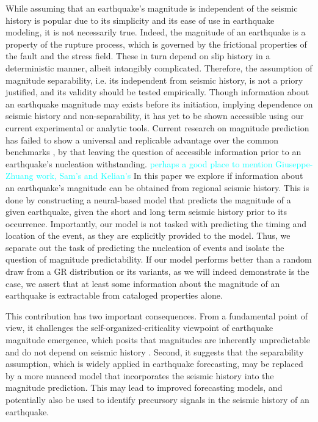 \documentclass[pdflatex]{sn-jnl}
\newcommand{\neri}[1]{{\textcolor{cyan}{#1}}}
\begin{document}
While assuming that an earthquake's magnitude is independent of the seismic history is popular due to its simplicity and its ease of use in earthquake modeling, it is not necessarily true. Indeed, the magnitude of an earthquake is a property of the rupture process, which is governed by the frictional properties of the fault and the stress field. These in turn depend on slip history in a deterministic manner, albeit intangibly complicated. Therefore, the assumption of magnitude separability, i.e. its independent from seismic history, is not a priory justified, and its validity should be tested empirically.
Though information about an earthquake magnitude may exists before its initiation, implying dependence on seismic history and non-separability, it has yet to be shown accessible using our current experimental or analytic tools. Current research on magnitude prediction has failed to show a universal and replicable advantage over the common benchmarks \cite{shcherbakov_forecasting_2019, ogata_exploring_2018, stockman_forecasting_2023,  panakkat_neural_2007}, by that leaving the question of accessible information prior to an earthquake's nucleation withstanding. 
\newline
\neri{perhaps a good place to mention Giuseppe-Zhuang work, Sam's  and Kelian's}
In this paper we explore if information about an earthquake's magnitude can be obtained from regional seismic history. This is done by constructing a neural-based model that predicts the magnitude of a given earthquake, given the short and long term seismic history prior to its occurrence. Importantly, our model is not tasked with predicting the timing and location of the event, as they are explicitly provided to the model. Thus, we separate out the task of predicting the nucleation of events and isolate the question of magnitude predictability. If our model performs better than a random draw from a GR distribution or its variants, as we will indeed demonstrate is the case, we assert that at least some information about the magnitude of an earthquake is extractable from cataloged properties alone. 


This contribution has two important consequences. From a fundamental point of view, it challenges the self-organized-criticality viewpoint of earthquake magnitude emergence, which posits that magnitudes are inherently unpredictable and do not depend on seismic history \cite{olami_self-organized_1992, sornette_self-organized_1989, bak_earthquakes_1989, de_geus_scaling_2022}. Second, it suggests that the separability assumption, which is widely applied in earthquake forecasting, may be replaced by a more nuanced model that incorporates the seismic history into the magnitude prediction. This may lead to improved forecasting models, and potentially also be used to identify precursory signals in the seismic history of an earthquake.
\end{document}
